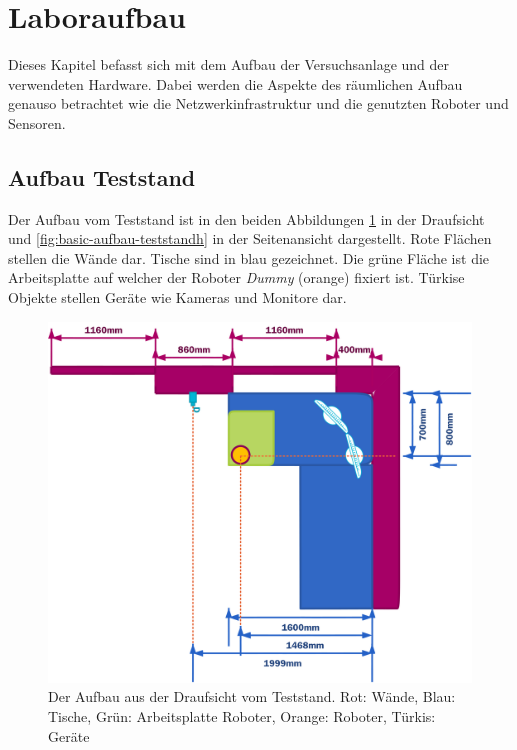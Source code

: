\section{Laboraufbau}
\label{sec:basic-aufbau}
    
Dieses Kapitel befasst sich mit dem Aufbau der Versuchsanlage und der verwendeten Hardware. Dabei werden die Aspekte des räumlichen Aufbau genauso betrachtet wie die Netzwerkinfrastruktur und die genutzten Roboter und Sensoren.



\subsection{Aufbau Teststand}
Der Aufbau vom Teststand ist in den beiden Abbildungen \ref{fig:basic-aufbau-teststand} in der Draufsicht und \ref{fig:basic-aufbau-teststandh} in der Seitenansicht dargestellt. Rote Flächen stellen die Wände dar. Tische sind in blau gezeichnet. Die grüne Fläche ist die Arbeitsplatte auf welcher der Roboter \textit{Dummy} (orange) fixiert ist. Türkise Objekte stellen Geräte wie Kameras und Monitore dar.

 \begin{figure}[H]
 	\centering
 	\includegraphics[scale=0.8]{fig/ZeichnungRaum}   
 	\caption[Aufbau Teststand: Draufsicht]{Der Aufbau aus der Draufsicht vom Teststand. Rot: Wände, Blau: Tische, Grün: Arbeitsplatte Roboter, Orange: Roboter, Türkis: Geräte}
 	\label{fig:basic-aufbau-teststand}
 \end{figure}
 
